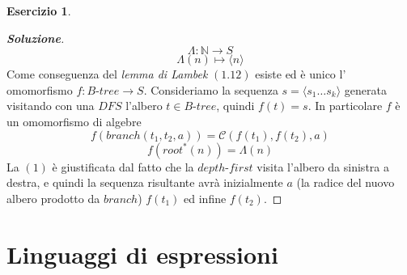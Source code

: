 \documentclass{article}
\theoremstyle{definition}
\newtheorem{esercizio}{Esercizio}
\theoremstyle{definition}
\theoremstyle{definition}
\theoremstyle{remark}
\begin{document}
\begin{esercizio}
\begin{proof}[\textbf{Soluzione}]
        $$\Lambda : \mathbb{N}\to S$$
        $$\Lambda(n)\mapsto \langle n\rangle$$
        Come conseguenza del \textit{lemma di Lambek} $(1.12)$ esiste  ed è unico l' omomorfismo $f:B\text{-}tree\to S$.
        Consideriamo la sequenza $s = \langle s_1\dots s_k\rangle$ generata visitando con una $DFS$ l'albero $t\in B\text{-}tree$,
        quindi $f(t) = s$. In particolare $f$ è un omomorfismo di algebre
        \begin{equation}
            f(branch(t_1,t_2,a)) = \mathcal{C}(f(t_1),f(t_2),a)
        \end{equation}
        \begin{equation}
            f(root^*(n)) = \Lambda(n)
        \end{equation}
        La $(1)$ è giustificata dal fatto che la  $depth$-$first$ visita l'albero  da  sinistra a destra, e quindi la sequenza
        risultante avrà inizialmente $a$ (la radice del nuovo albero prodotto da $branch$) $f(t_1)$  ed infine $f(t_2)$.
    \end{proof}
\end{esercizio}

\section{Linguaggi di espressioni}
\end{document}
